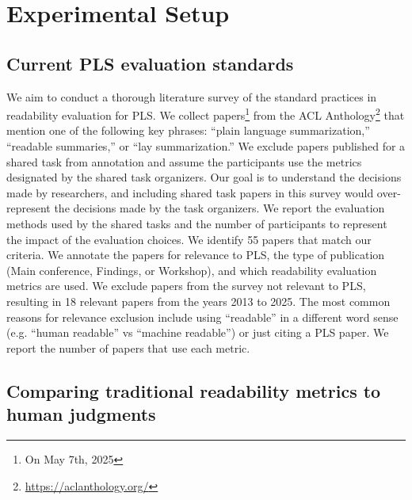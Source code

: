 \section{Experimental Setup}\label{sec:5-chapter-experimental-setup}
\subsection[Current PLS evaluation standards]{Current PLS evaluation standards \hyperref[rq1]{\rqone}}

We aim to conduct a thorough literature survey of the standard practices in readability evaluation for PLS. We collect papers\footnote{On May 7th, 2025} from the ACL Anthology\footnote{\url{https://aclanthology.org/}} that mention one of the following key phrases: ``plain language summarization,'' ``readable summaries,'' or ``lay summarization.'' We exclude papers published for a shared task from annotation and assume the participants use the metrics designated by the shared task organizers. Our goal is to understand the decisions made by researchers, and including shared task papers in this survey would over-represent the decisions made by the task organizers. We report the evaluation methods used by the shared tasks and the number of participants to represent the impact of the evaluation choices. We identify 55 papers that match our criteria. We annotate the papers for relevance to PLS, the type of publication (Main conference, Findings, or Workshop), and which readability evaluation metrics are used. We exclude papers from the survey not relevant to PLS, resulting in 18 relevant papers from the years 2013 to 2025. The most common reasons for relevance exclusion include using ``readable'' in a different word sense (e.g. ``human readable'' vs ``machine readable'') or just citing a PLS paper. We report the number of papers that use each  metric.

\subsection[Comparing traditional readability metrics to human judgments]{Comparing traditional readability metrics to human judgments \hyperref[rq2]{\rqtwo}}


